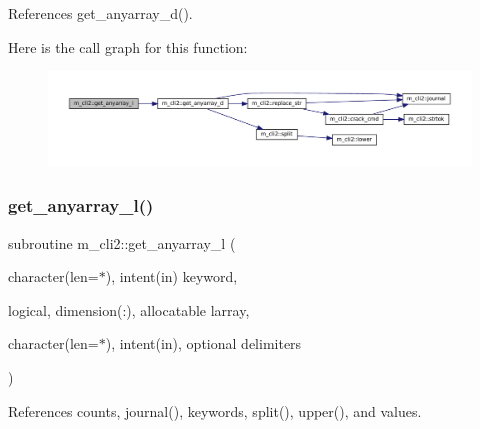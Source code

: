 References get\+\_\+anyarray\+\_\+d().

Here is the call graph for this function\+:\nopagebreak
\begin{figure}[H]
\begin{center}
\leavevmode
\includegraphics[width=350pt]{namespacem__cli2_ad314315dd5c93abff5168265f5ff0e4e_cgraph}
\end{center}
\end{figure}
\mbox{\label{namespacem__cli2_a47cc758d20b655bc21672c31289e54ce}} 
\subsubsection{\texorpdfstring{get\+\_\+anyarray\+\_\+l()}{get\_anyarray\_l()}}
{\footnotesize\ttfamily subroutine m\+\_\+cli2\+::get\+\_\+anyarray\+\_\+l (\begin{DoxyParamCaption}\item[{character(len=$\ast$), intent(in)}]{keyword,  }\item[{logical, dimension(\+:), allocatable}]{larray,  }\item[{character(len=$\ast$), intent(in), optional}]{delimiters }\end{DoxyParamCaption})\hspace{0.3cm}{\ttfamily [private]}}



References counts, journal(), keywords, split(), upper(), and values.

